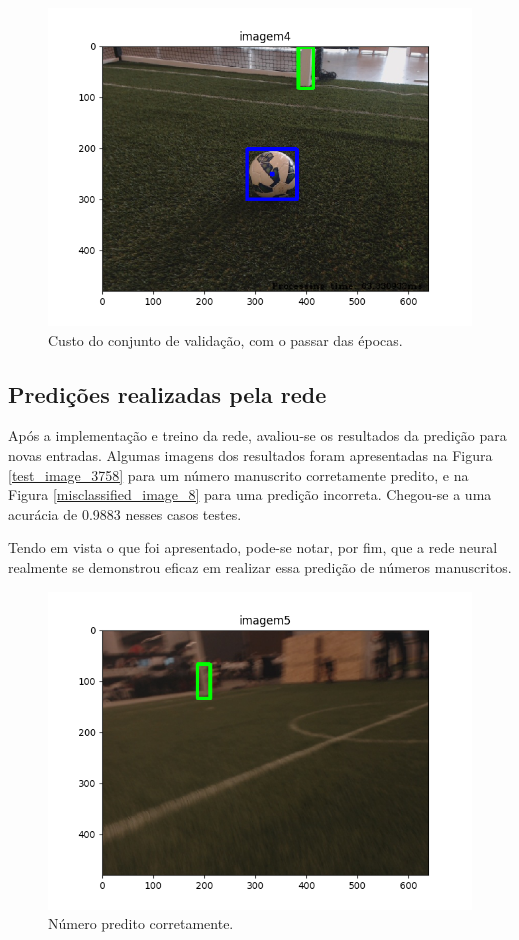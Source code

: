 \documentclass[conference]{IEEEtran}
\begin{document}
\begin{figure}[htbp]
\centering
\centerline{\includegraphics[scale=0.5]{imagens/imagem4_detection.png}}
\caption{Custo do conjunto de validação, com o passar das épocas.}
\label{imagem4_detection}
\end{figure}

\subsection{Predições realizadas pela rede}
Após a implementação e treino da rede, avaliou-se os resultados da predição para novas entradas. Algumas imagens dos resultados foram apresentadas na Figura \ref{test_image_3758} para um número manuscrito corretamente predito, e na Figura \ref{misclassified_image_8} para uma predição incorreta. Chegou-se a uma acurácia de 0.9883 nesses casos testes.

Tendo em vista o que foi apresentado, pode-se notar, por fim, que a rede neural realmente se demonstrou eficaz em realizar essa predição de números manuscritos.

\begin{figure}[htbp]
\centering
\centerline{\includegraphics[scale=0.5]{imagens/imagem5_detection.png}}
\caption{Número predito corretamente.}
\label{imagem5_detection}
\end{figure}
\end{document}
